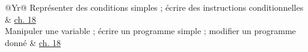 \begin{tabularx}{\linewidth}{@{}Yr@{}}\toprule
Représenter des conditions simples ; écrire des instructions conditionnelles & \hyperref[chap-18]{ch. 18}\\[1.2mm]
Manipuler une variable ; écrire un programme simple ; modifier un programme donné & \hyperref[chap-18]{ch. 18}\\[1.2mm]
\bottomrule\end{tabularx}\par\vspace{3mm}
\clearpage
